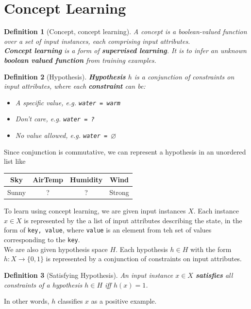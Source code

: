 \documentclass[12pt]{article}
\newtheorem{definition}{Definition}[section]
\theoremstyle{definition}
\begin{document}
\section{Concept Learning}
\begin{definition}[Concept, concept learning]
\normalfont A concept is a boolean-valued function over a set of input instances, each comprising input attributes.\\
\textbf{Concept learning} is a form of \textbf{supervised learning}. It is to infer an unknown \textbf{boolean valued function} from \textit{training examples}.
\end{definition}
\begin{definition}[Hypothesis]
\normalfont \textbf{Hypothesis} $h$ is a conjunction of constraints on input attributes, where each \textbf{constraint} can be:
\begin{itemize}
	\item A specific value, e.g. \texttt{water = warm}
	\item Don't care, e.g. \texttt{water = ?}
	\item No value allowed, e.g. \texttt{water = }$\varnothing$
\end{itemize}
\end{definition}
Since conjunction is commutative, we can represent a hypothesis in an unordered list like
\begin{table}[h]
\centering
\begin{tabular}{|c|c|c|c|}
\hline
Sky & AirTemp & Humidity & Wind\\\hline
Sunny & ? & ? & Strong \\\hline
\end{tabular}
\end{table}
To learn using concept learning, we are given input instances $X$. Each instance $x\in X$ is represented by the a list of input attributes describing the state, in the form of \texttt{key, value}, where \texttt{value} is an element from teh set of values corresponding to the \texttt{key}.\\
We are also given hypothesis space $H$. Each hypothesis $h\in H$ with the form $h: X\to \{0,1\}$ is represented by a conjunction of constraints on input attributes.
\begin{definition}[Satisfying Hypothesis]
\normalfont An input instance $x\in X$ \textbf{satisfies} all constraints of a hypothesis $h\in H$ iff $h(x)=1$.
\end{definition}
In other words, $h$ classifies $x$ as a positive example.\\
\end{document}
